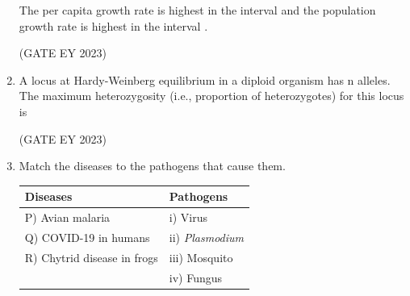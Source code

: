\documentclass[journal,12pt,onecolumn]{IEEEtran}
\theoremstyle{remark}
\begin{document}
\begin{enumerate}
The per capita growth rate is highest in the interval \underline{\hspace{1.5cm}} and the population
growth rate is highest in the interval\underline{\hspace{1.5cm}} . 
\begin{enumerate}
\end{enumerate}



\hfill{(GATE EY 2023)}

 \item A locus at Hardy-Weinberg equilibrium in a diploid organism has n alleles. The
maximum heterozygosity (i.e., proportion of heterozygotes) for this locus is
\begin{enumerate}
\end{enumerate}


\hfill{(GATE EY 2023)}

 \item Match the diseases to the pathogens that cause them.
\begin{table}[h!]
\centering
\begin{tabular}{|l|l|}
\hline
\textbf{Diseases} & \textbf{Pathogens} \\ \hline
P) Avian malaria          & i) Virus \\ \hline
Q) COVID-19 in humans     & ii) \textit{Plasmodium} \\ \hline
R) Chytrid disease in frogs & iii) Mosquito \\ \hline
                         & iv) Fungus \\ \hline
\end{tabular}
\end{table}


\begin{enumerate}
\end{enumerate}
\end{enumerate}
\end{document}
